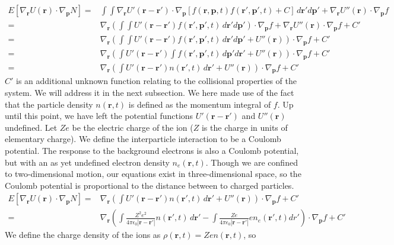 \documentclass{article}
\begin{document}
\begin{align*}
E\left[\nabla_\mathbf{r} U(\mathbf{r})\cdot\nabla_\mathbf{p}N\right]=&\int\int\nabla_\mathbf{r}U'(\mathbf{r}-\mathbf{r}')\cdot\nabla_\mathbf{p}[f(\mathbf{r},\mathbf{p},t)f(\mathbf{r}',\mathbf{p}',t)+C]\,d\mathbf{r}'d\mathbf{p}'+\nabla_\mathbf{r}U''(\mathbf{r})\cdot\nabla_\mathbf{p}f\\
=&\nabla_\mathbf{r}\left(\int\int U'(\mathbf{r}-\mathbf{r}')f(\mathbf{r}',\mathbf{p}',t)\,d\mathbf{r}'d\mathbf{p}'\right)\cdot\nabla_\mathbf{p}f+\nabla_\mathbf{r}U''(\mathbf{r})\cdot\nabla_\mathbf{p}f+C'\\
=&\nabla_\mathbf{r}\left(\int\int U'(\mathbf{r}-\mathbf{r}')f(\mathbf{r}',\mathbf{p}',t)\,d\mathbf{r}'d\mathbf{p}'+U''(\mathbf{r})\right)\cdot\nabla_\mathbf{p} f+C'\\
=&\nabla_\mathbf{r}\left(\int U'(\mathbf{r}-\mathbf{r}')\int f(\mathbf{r}',\mathbf{p}',t)\,d\mathbf{p}'d\mathbf{r}'+U''(\mathbf{r})\right)\cdot\nabla_\mathbf{p} f+C'\\
=&\nabla_\mathbf{r}\left(\int U'(\mathbf{r}-\mathbf{r}')n(\mathbf{r}',t)\,d\mathbf{r}'+U''(\mathbf{r})\right)\cdot\nabla_\mathbf{p} f+C'
\end{align*}$C'$ is an additional unknown function relating to the collisional properties of the system. We will address it in the next subsection. We here made use of the fact that the particle density $n(\mathbf{r},t)$ is defined as the momentum integral of $f$. Up until this point, we have left the potential functions $U'(\mathbf{r}-\mathbf{r}')$ and $U''(\mathbf{r})$ undefined. Let $Ze$ be the electric charge of the ion ($Z$ is the charge in units of elementary charge). We define the interparticle interaction to be a Coulomb potential. The response to the background electrons is also a Coulomb potential, but with an as yet undefined electron density $n_e(\mathbf{r},t)$. Though we are confined to two-dimensional motion, our equations exist in three-dimensional space, so the Coulomb potential is proportional to the distance between to charged particles.
\begin{align*}
E\left[\nabla_\mathbf{r} U(\mathbf{r})\cdot\nabla_\mathbf{p}N\right]=&\nabla_\mathbf{r}\left(\int U'(\mathbf{r}-\mathbf{r}')n(\mathbf{r}',t)\,d\mathbf{r}'+U''(\mathbf{r})\right)\cdot\nabla_\mathbf{p} f+C'\\
=&\nabla_\mathbf{r}\left(\int \frac{Z^2e^2}{4\pi\epsilon_0|\mathbf{r}-\mathbf{r}'|}n(\mathbf{r}',t)\,d\mathbf{r}'-\int \frac{Ze}{4\pi\epsilon_0|\mathbf{r}-\mathbf{r}'|}en_e(\mathbf{r}',t)dr'\right)\cdot\nabla_\mathbf{p}f+C'
\end{align*}We define the charge density of the ions as $\rho(\mathbf{r},t)=Zen(\mathbf{r},t)$, so
\end{document}
